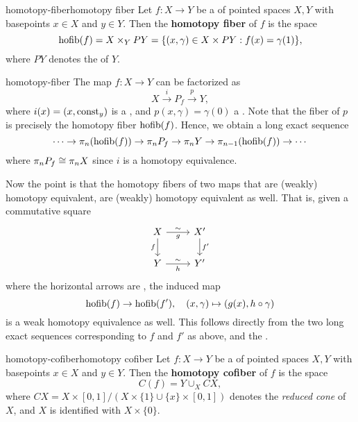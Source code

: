 \begin{topic}{homotopy-fiber}{homotopy fiber}
    Let $f : X \to Y$ be a  of pointed spaces $X, Y$ with basepoints $x \in X$ and $y \in Y$. Then the \textbf{homotopy fiber} of $f$ is the space
    \[ \textup{hofib}(f) = X \times_Y P Y = \{ (x, \gamma) \in X \times P Y : f(x) = \gamma(1) \} , \]
    where $P Y$ denotes the  of $Y$.
\end{topic}

\begin{example}{homotopy-fiber}
    The map $f : X \to Y$ can be factorized as
    \[ X \xrightarrow{i} P_f \xrightarrow{p} Y , \]
    where $i(x) = (x, \textup{const}_y)$ is a , and $p(x, \gamma) = \gamma(0)$ a . Note that the fiber of $p$ is precisely the homotopy fiber $\textup{hofib}(f)$. Hence, we obtain a long exact sequence
    \[ \cdots \to \pi_n(\textup{hofib}(f)) \to \pi_n P_f \to \pi_n Y \to \pi_{n - 1}(\textup{hofib}(f)) \to \cdots \]
    where $\pi_n P_f \cong \pi_n X$ since $i$ is a homotopy equivalence.
    
    Now the point is that the homotopy fibers of two maps that are (weakly) homotopy equivalent, are (weakly) homotopy equivalent as well. That is, given a commutative square
    \[ \begin{tikzcd} X \arrow[swap]{d}{f} \arrow["g"']{r}{\sim} & X' \arrow{d}{f'} \\ Y \arrow["h"']{r}{\sim} & Y' \end{tikzcd} \]
    where the horizontal arrows are , the induced map
    \[ \textup{hofib}(f) \to \textup{hofib}(f'), \quad (x, \gamma) \mapsto (g(x), h \circ \gamma) \]
    is a weak homotopy equivalence as well. This follows directly from the two long exact sequences corresponding to $f$ and $f'$ as above, and the .
\end{example}

\begin{topic}{homotopy-cofiber}{homotopy cofiber}
    Let $f : X \to Y$ be a  of pointed spaces $X, Y$ with basepoints $x \in X$ and $y \in Y$. Then the \textbf{homotopy cofiber} of $f$ is the space
    \[ C(f) = Y \cup_X CX , \]
    where $CX = X \times [0, 1] / (X \times \{ 1 \} \cup \{ x \} \times [0, 1])$ denotes the \textit{reduced cone} of $X$, and $X$ is identified with $X \times \{ 0 \}$.
\end{topic}

